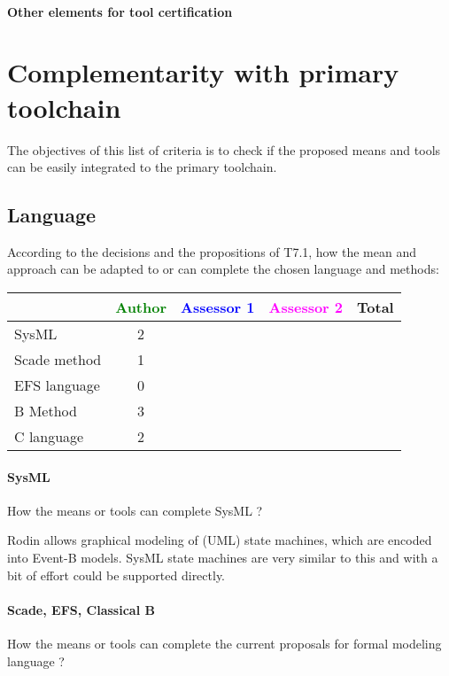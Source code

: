 \paragraph{Other elements for tool certification}


\section{Complementarity with primary toolchain}

The objectives of this list of criteria is to check if the proposed means and tools can be easily integrated to the primary toolchain.

\subsection{Language}


According to the decisions and the propositions of T7.1, how the mean and approach can be adapted to or can complete the chosen language and methods:

\begin{tabular}{|l | c | c | c | c|}
\hline
& \textcolor{green}{Author} & \textcolor{blue}{Assessor 1} & \textcolor{magenta}{Assessor 2} & Total \\
\hline 
SysML  & 2 & & & \\
\hline
Scade method & 1 & & & \\
\hline
EFS language & 0 & & & \\
\hline
B Method & 3 & & & \\
\hline
C language & 2 & & & \\
\hline
\end{tabular}


\paragraph{SysML}
How the means or tools can complete SysML ?

\begin{author_comment}
  Rodin allows graphical modeling of (UML) state machines, which are encoded
  into Event-B models. SysML state machines are very similar to this and with a
  bit of effort could be supported directly.
\end{author_comment}


\paragraph{Scade, EFS, Classical B}
How the means or tools can complete the current proposals for formal modeling language ?

